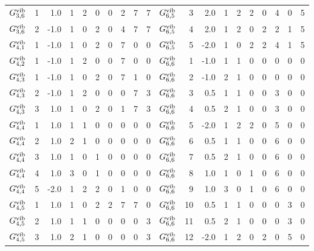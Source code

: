 \begin{tabular}{crrrrrrrrcrrrrrrrr}
    $ G^{\rm vib}_{  3, 6}  $& 1 &  1.0 & 1 & 2 & 0 & 0 & 2 & 7 & 7 &     $    G^{\rm vib}_{ 6, 5}  $&  3  &  2.0 & 1 & 2 & 2 & 0 & 4 & 0 & 5\\
    $ G^{\rm vib}_{  3, 6}  $& 2 & -1.0 & 1 & 0 & 2 & 0 & 4 & 7 & 7 &     $    G^{\rm vib}_{ 6, 5}  $&  4  &  2.0 & 1 & 2 & 0 & 2 & 2 & 1 & 5\\
    $ G^{\rm vib}_{  4, 1}  $& 1 & -1.0 & 1 & 0 & 2 & 0 & 7 & 0 & 0 &     $    G^{\rm vib}_{ 6, 5}  $&  5  & -2.0 & 1 & 0 & 2 & 2 & 4 & 1 & 5\\
    $ G^{\rm vib}_{  4, 2}  $& 1 & -1.0 & 1 & 2 & 0 & 0 & 7 & 0 & 0 &     $    G^{\rm vib}_{ 6, 6}  $&  1  & -1.0 & 1 & 1 & 0 & 0 & 0 & 0 & 0\\
    $ G^{\rm vib}_{  4, 3}  $& 1 & -1.0 & 1 & 0 & 2 & 0 & 7 & 1 & 0 &     $    G^{\rm vib}_{ 6, 6}  $&  2  & -1.0 & 2 & 1 & 0 & 0 & 0 & 0 & 0\\
    $ G^{\rm vib}_{  4, 3}  $& 2 & -1.0 & 1 & 2 & 0 & 0 & 0 & 7 & 3 &     $    G^{\rm vib}_{ 6, 6}  $&  3  &  0.5 & 1 & 1 & 0 & 0 & 3 & 0 & 0\\
    $ G^{\rm vib}_{  4, 3}  $& 3 &  1.0 & 1 & 0 & 2 & 0 & 1 & 7 & 3 &     $    G^{\rm vib}_{ 6, 6}  $&  4  &  0.5 & 2 & 1 & 0 & 0 & 3 & 0 & 0\\
    $ G^{\rm vib}_{  4, 4}  $& 1 &  1.0 & 1 & 1 & 0 & 0 & 0 & 0 & 0 &     $    G^{\rm vib}_{ 6, 6}  $&  5  & -2.0 & 1 & 2 & 2 & 0 & 5 & 0 & 0\\
    $ G^{\rm vib}_{  4, 4}  $& 2 &  1.0 & 2 & 1 & 0 & 0 & 0 & 0 & 0 &     $    G^{\rm vib}_{ 6, 6}  $&  6  &  0.5 & 1 & 1 & 0 & 0 & 6 & 0 & 0\\
    $ G^{\rm vib}_{  4, 4}  $& 3 &  1.0 & 1 & 0 & 1 & 0 & 0 & 0 & 0 &     $    G^{\rm vib}_{ 6, 6}  $&  7  &  0.5 & 2 & 1 & 0 & 0 & 6 & 0 & 0\\
    $ G^{\rm vib}_{  4, 4}  $& 4 &  1.0 & 3 & 0 & 1 & 0 & 0 & 0 & 0 &     $    G^{\rm vib}_{ 6, 6}  $&  8  &  1.0 & 1 & 0 & 1 & 0 & 6 & 0 & 0\\
    $ G^{\rm vib}_{  4, 4}  $& 5 & -2.0 & 1 & 2 & 2 & 0 & 1 & 0 & 0 &     $    G^{\rm vib}_{ 6, 6}  $&  9  &  1.0 & 3 & 0 & 1 & 0 & 6 & 0 & 0\\
    $ G^{\rm vib}_{  4, 5}  $& 1 &  1.0 & 1 & 0 & 2 & 2 & 7 & 7 & 0 &     $    G^{\rm vib}_{ 6, 6}  $&  10 &  0.5 & 1 & 1 & 0 & 0 & 0 & 3 & 0\\
    $ G^{\rm vib}_{  4, 5}  $& 2 &  1.0 & 1 & 1 & 0 & 0 & 0 & 0 & 3 &     $    G^{\rm vib}_{ 6, 6}  $&  11 &  0.5 & 2 & 1 & 0 & 0 & 0 & 3 & 0\\
    $ G^{\rm vib}_{  4, 5}  $& 3 &  1.0 & 2 & 1 & 0 & 0 & 0 & 0 & 3 &     $    G^{\rm vib}_{ 6, 6}  $&  12 & -2.0 & 1 & 2 & 0 & 2 & 0 & 5 & 0\\

\end{tabular}
